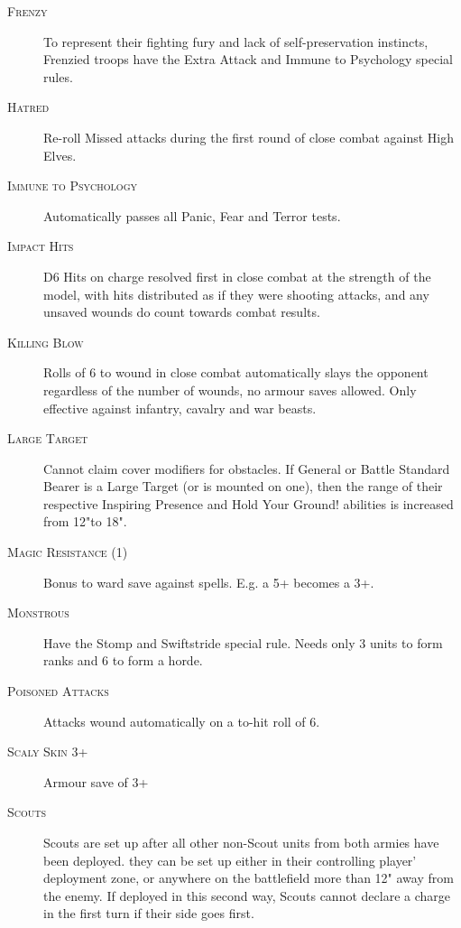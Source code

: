 \begin{description}
\item[\textsc{Frenzy}]\label{rule:frenzy} To represent their fighting fury and lack of self-preservation instincts, Frenzied troops have the Extra Attack and Immune to Psychology\hyperref[rule:immune]{\dragon} special rules.
\item[\textsc{Hatred}]\label{rule:hatred} Re-roll Missed attacks during the first round of close combat against High Elves. 
\item[\textsc{Immune to Psychology}]\label{rule:immune} Automatically passes all Panic, Fear and Terror tests.
\item[\textsc{Impact Hits}]\label{rule:impacthits} D6 Hits on charge resolved first in close combat at the strength of the model, with hits distributed as if they were shooting attacks, and any unsaved wounds do count towards combat results. 
\item[\textsc{Killing Blow}]\label{rule:killingblow} Rolls of 6 to wound in close combat automatically slays the opponent regardless of the number of wounds, no armour saves allowed. Only effective against infantry, cavalry and war beasts.
\item[\textsc{Large Target}]\label{rule:largetarget} Cannot claim cover modifiers for obstacles. If General or Battle Standard Bearer is a Large Target (or is mounted on one), then the range of their respective Inspiring Presence and Hold Your Ground! abilities is increased from 12"to 18".
\item[\textsc{Magic Resistance (1)}]\label{rule:magicresistance} Bonus to ward save against spells. E.g. a 5+ becomes a 3+.
\item[\textsc{Monstrous}]\label{rule:monstrous} Have the Stomp and Swiftstride special rule. Needs only 3 units to form ranks and 6 to form a horde.
\item[\textsc{Poisoned Attacks}]\label{rule:poisonedattacks} Attacks wound automatically on a to-hit roll of 6.
\item[\textsc{Scaly Skin 3+}]\label{rule:scalyskin} Armour save of 3+ 
\item[\textsc{Scouts}]\label{rule:scouts} Scouts are set up after all other non-Scout units from both armies have been deployed. they can be set up either in their controlling player' deployment zone, or anywhere on the battlefield more than 12" away from the enemy. If deployed in this second way, Scouts cannot declare a charge in the first turn if their side goes first.

\end{description}
